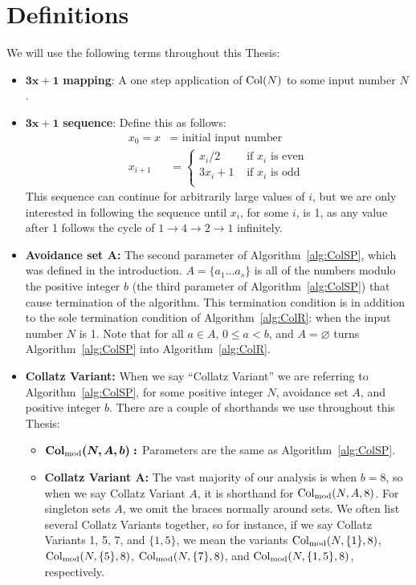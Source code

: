 \chapter{Definitions} \label{sec:defns}
We will use the following terms throughout this Thesis:
\begin{itemize}
    \item $\boldsymbol{3x+1}$\textbf{ mapping}: A one step application of $\mathrm{Col}(N)$ to some input number $N$.
    \item $\boldsymbol{3x+1}$\textbf{ sequence}: Define this as follows: 
    \begin{align*}
        x_0 = x &= \text{ initial input number} \\
        x_{i+1} &= \begin{cases} 
        x_{i}/2 &\text{ if $x_i$ is even} \\
        3 x_{i} + 1 &\text{ if $x_i$ is odd} \\
        \end{cases}
    \end{align*}
    This sequence can continue for arbitrarily large values of $i$, but we are only interested in following the sequence until $x_i$, for some $i$, is 1, as any value after 1 follows the cycle of $1 \rightarrow 4 \rightarrow 2 \rightarrow 1$ infinitely.
    \item \textbf{Avoidance set $\boldsymbol A$:} The second parameter of Algorithm~\ref{alg:ColSP}, which was defined in the introduction. $A = \{a_1 \ldots a_s\}$ is all of the numbers modulo the positive integer $b$ (the third parameter of Algorithm~\ref{alg:ColSP}) that cause termination of the algorithm. This termination condition is in addition to the sole termination condition of Algorithm~\ref{alg:ColR}: when the input number $N$ is 1. Note that for all $a \in A$, $0 \le a < b$, and $A = \varnothing$ turns Algorithm~\ref{alg:ColSP} into Algorithm~\ref{alg:ColR}.
    \item \textbf{Collatz Variant:} When we say ``Collatz Variant'' we are referring to Algorithm~\ref{alg:ColSP}, for some positive integer $N$, avoidance set $A$, and positive integer $b$. There are a couple of shorthands we use throughout this Thesis:
      \begin{itemize}
      \item $\boldsymbol{\mathrm{Col}_{\text{mod}}(N,A,b):}$ Parameters are the same as Algorithm~\ref{alg:ColSP}.
      \item \textbf{Collatz Variant A:} The vast majority of our analysis is when $b = 8$, so when we say Collatz Variant $A$, it is shorthand for $\mathrm{Col}_{\text{mod}}(N,A,8)$. For singleton sets $A$, we omit the braces normally around sets. We often list several Collatz Variants together, so for instance, if we say Collatz Variants 1, 5, 7, and $\{1,5\}$, we mean the variants $\mathrm{Col}_{\text{mod}}(N,\{1\},8)$, $\mathrm{Col}_{\text{mod}}(N,\{5\},8)$, $\mathrm{Col}_{\text{mod}}(N,\{7\},8)$, and $\mathrm{Col}_{\text{mod}}(N,\{1,5\},8)$, respectively.

\end{itemize}
\end{itemize}
